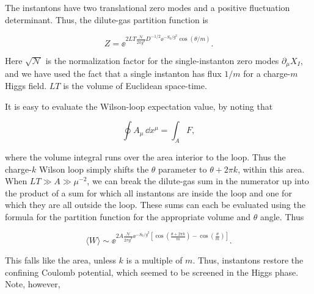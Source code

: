 The instantons have two translational zero modes and a positive fluctuation
determinant. Thus, the dilute-gas partition function is

\[
  Z=\ee^{2LT\frac{\mathcal N}{2\pi g^2}D^{-1/2}
  \ee^{-S_0/g^2}\cos(\theta/m)}.
\]

Here $\sqrt{\mathcal N}$ is the normalization factor for the single-instanton
zero modes $\partial_\mu X_I$, and we have used the fact that a single instanton
has flux $1/m$ for a charge-$m$ Higgs field. $LT$ is the volume of Euclidean
space-time.

It is easy to evaluate the Wilson-loop expectation value, by noting that

\[
  \oint A_\mu\,\dd x^\mu=\int_A F,
\]

where the volume integral runs over the area interior to the loop. Thus the
charge-$k$ Wilson loop simply shifts the $\theta$ parameter to $\theta+2\pi k$,
within this area. When $LT\gg A\gg\mu^{-2}$, we can break the dilute-gas sum
in the numerator up into the product of a sum for which all instantons are
inside the loop and one for which they are all outside the loop. These sums can
each be evaluated using the formula for the partition function for the
appropriate volume and $\theta$ angle. Thus

\[
  \langle W\rangle\sim
  \ee^{2A\frac{\mathcal N}{2\pi g^2}\ee^{-S_0/g^2}
  \left[\cos\left(\frac{\theta+2\pi k}{m}\right)
  -\cos\left(\frac{\theta}{m}\right)\right]}.
\]

This falls like the area, unless $k$ is a multiple of $m$. Thus, instantons
restore the confining Coulomb potential, which seemed to be screened in the
Higgs phase. Note, however,
